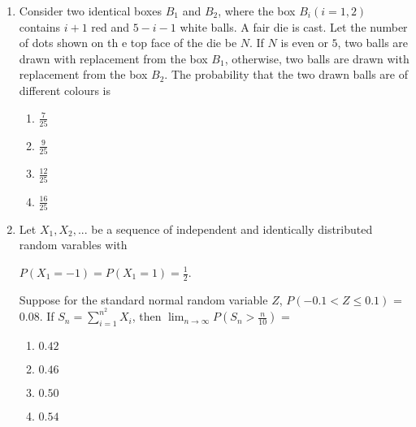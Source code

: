 \documentclass[journal]{IEEEtran}
\theoremstyle{remark}
\begin{document}
\begin{enumerate}
                \item Consider two identical boxes $B_{1}$ and $B_{2}$, where the box $B_{i}(i=1,2)$ contains $i+1$ red and  $5-i-1$ white balls. A fair die is cast. Let the number of dots shown on th                      e top face of the die be $ N$. If $ N$ is even or $5$, two balls are drawn with replacement from the box $B_{1}$, otherwise, two balls are drawn with replacement from the box $B_                      {2}$. The probability that the two drawn balls are of different colours is 
                \begin{multicols}{4}
                \begin{enumerate}
                    \item $\frac{7}{25}$
                    \item $\frac{9}{25}$
                    \item $\frac{12}{25}$
                    \item $\frac{16}{25}$
                \end{enumerate}
                \end{multicols}

                \item Let $X_1,X_2,...$ be a sequence of independent and identically distributed random varables with
                \begin{center}
                   $P(X_1=-1) = P(X_1=1) = \frac{1}{2}$. 
                \end{center}
                Suppose for the standard normal random  variable $Z$, $P(-0.1<Z\le0.1)$ = $0.08$.
                If $S_n = \sum_{i=1}^{n^2} X_i$, then $\lim_{n \to \infty} P(S_n>\frac{n}{10})$ =
                \begin{multicols}{4}
                \begin{enumerate}
                    \item $0.42$
                    \item $0.46$
                    \item $0.50$
                    \item $0.54$
                \end{enumerate}
                    
                \end{multicols}


\end{enumerate}
\end{document}
